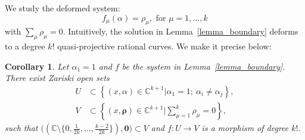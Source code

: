\documentclass[11pt]{amsart}
\newtheorem{corollary}[theorem]{Corollary}
\theoremstyle{remark}
\numberwithin{equation}{section}
\begin{document}
We study the deformed system:
\[
    f_\mu (\alpha) = \rho_\mu, \text{ for }\mu=1,\dots,k
\]
with $\sum_\mu \rho_\mu=0$. Intuitively, the solution in Lemma~\ref{lemma_boundary} deforms to a degree $k!$ quasi-projective rational curves. We make it precise below:
\begin{corollary} \label{cor_boundary}
Let $\alpha_1=1$ and $f$ be the system in Lemma~\ref{lemma_boundary}. There exist Zariski open sets 
\[
\begin{split}
    U &\subset \left\{ (x,\alpha)\in \mathbb{C}^{k+1} | \alpha_1=1; \ \alpha_i \neq \alpha_j   \right\},
    \\
    V &\subset \left\{ (x, \boldsymbol{\rho}) \in \mathbb{C}^{k+1} \Big| \sum_{\mu=1}^k \rho_\mu =0 \right\},
\end{split}
\]
such that $\Big( (\mathbb{C}\setminus\{ 0, \frac{1}{2k}, \dots,\frac{k-2}{2k} \}), \mathbf{0} \Big) \subset V$ and $f: U \rightarrow V$ is a morphism of degree $k!$.
\end{corollary}
\end{document}
